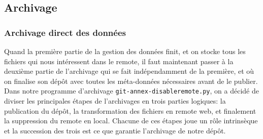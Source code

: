 \documentclass[11pt]{article}
\begin{document}
\subsection{Archivage}
\label{sec:orgf785d0a}
\subsubsection{Archivage direct des données}
\label{sec:org8366cf9}
Quand la première partie de la gestion des données finit, et on stocke
tous les fichiers qui nous intéressent dans le remote, il faut
maintenant passer à la deuxième partie de l'archivage qui se fait
indépendamment de la première, et où on finalise son dépôt avec toutes
les méta-données nécessaires avant de le publier.
Dans notre programme d'archivage \texttt{git-annex-disableremote.py}, on a
décidé de diviser les principales étapes de l'archivages en trois
parties logiques: la publication du dépôt, la transformation des
fichiers en remote web, et finalement la suppression du remote en
local. Chacune de ces étapes joue un rôle intrinsèque et la succession
des trois est ce que garantie l'archivage de notre dépôt.
\end{document}
